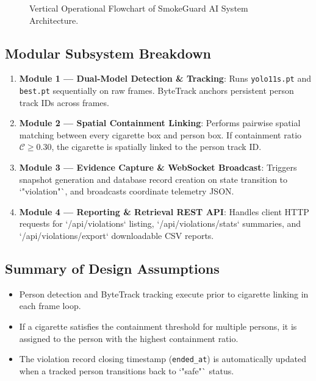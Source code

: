 \documentclass[11pt,a4paper]{article}
\begin{document}
\begin{figure}[H]
\caption{Vertical Operational Flowchart of SmokeGuard AI System Architecture.}
\label{fig:vertical_flowchart}
\end{figure}

\subsection{Modular Subsystem Breakdown}
\begin{enumerate}[leftmargin=*]
    \item \textbf{Module 1 — Dual-Model Detection \& Tracking}: Runs \texttt{yolo11s.pt} and \texttt{best.pt} sequentially on raw frames. ByteTrack anchors persistent person track IDs across frames.
    \item \textbf{Module 2 — Spatial Containment Linking}: Performs pairwise spatial matching between every cigarette box and person box. If containment ratio $\mathcal{C} \ge 0.30$, the cigarette is spatially linked to the person track ID.
    \item \textbf{Module 3 — Evidence Capture \& WebSocket Broadcast}: Triggers snapshot generation and database record creation on state transition to `"violation"`, and broadcasts coordinate telemetry JSON.
    \item \textbf{Module 4 — Reporting \& Retrieval REST API}: Handles client HTTP requests for `/api/violations` listing, `/api/violations/stats` summaries, and `/api/violations/export` downloadable CSV reports.
\end{enumerate}

\subsection{Summary of Design Assumptions}
\begin{itemize}[leftmargin=*]
    \item Person detection and ByteTrack tracking execute prior to cigarette linking in each frame loop.
    \item If a cigarette satisfies the containment threshold for multiple persons, it is assigned to the person with the highest containment ratio.
    \item The violation record closing timestamp (\texttt{ended\_at}) is automatically updated when a tracked person transitions back to `"safe"` status.
\end{itemize}
\end{document}
